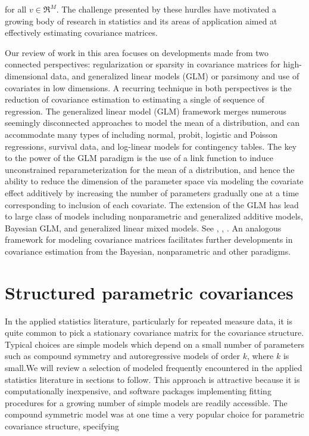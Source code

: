 \noindent
for all $v \in \Re^M$. The challenge presented by these hurdles have motivated a growing body of research in statistics and its areas of application aimed at effectively estimating covariance matrices.

\bigskip

Our review of work in this area focuses on developments made from two connected perspectives: regularization or sparsity in covariance matrices for high-dimensional data, and generalized linear models (GLM) or parsimony and use of covariates in low dimensions. A recurring technique in both perspectives is the reduction of covariance estimation to estimating a single of sequence of regression. The generalized linear model (GLM) framework \cite{McCullagh1989} merges numerous seemingly disconnected approaches to model the mean of a distribution, and can accommodate many types of including normal, probit, logistic and Poisson regressions, survival data, and log-linear models for contingency tables. The key to the power of the GLM paradigm is the use of a link function to induce unconstrained reparameterization for the mean of a distribution, and hence the ability to reduce the dimension of the parameter space via modeling the covariate effect additively by increasing the number of parameters gradually one at a time corresponding to inclusion of each covariate. The extension of the GLM has lead to large class of models including nonparametric and generalized additive models, Bayesian GLM, and generalized linear mixed models. See \cite{hastie1990generalized},  \cite{dey2000generalized},  \cite{mcculloch2001generalized}. An analogous framework for modeling covariance matrices facilitates further developments in covariance estimation from the Bayesian, nonparametric and other paradigms.





\section{Structured parametric covariances} \label{chapter-1-parametric-covariance-models}


In the applied statistics literature, particularly for repeated measure data, it is quite common to pick a stationary covariance matrix for the covariance structure. Typical choices are simple models which depend on a small number of parameters such as compound symmetry and autoregressive models of order $k$, where $k$ is small.We will review a selection of modeled frequently encountered in the applied statistics literature in sections to follow. This approach is attractive because it is computationally inexpensive, and software packages implementing fitting procedures for a growing number of simple models are readily accessible. The compound symmetric model was at one time a very popular choice for parametric covariance structure, specifying

